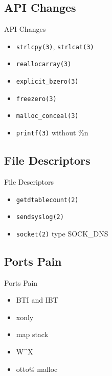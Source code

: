 \documentclass[14pt,aspectratio=169]{beamer}
\begin{document}
\subsection{API Changes}
\begin{frame}{API Changes}
\begin{itemize}
  \item \texttt{strlcpy(3)}, \texttt{strlcat(3)}
  \item \texttt{reallocarray(3)}
  \item \texttt{explicit\_bzero(3)}
  \item \texttt{freezero(3)}
  \item \texttt{malloc\_conceal(3)}
  \item \texttt{printf(3)} without \%n
\end{itemize}
\end{frame}

\subsection{File Descriptors}
\begin{frame}{File Descriptors}
\begin{itemize}
  \item \texttt{getdtablecount(2)}
  \item \texttt{sendsyslog(2)}
  \item \texttt{socket(2)} type SOCK\_DNS
\end{itemize}
\end{frame}

\subsection{Ports Pain}
\begin{frame}{Ports Pain}
\begin{itemize}
  \item BTI and IBT
  \item xonly
  \item map stack
  \item W\^{}X
  \item otto@ malloc
\end{itemize}
\end{frame}
\end{document}
